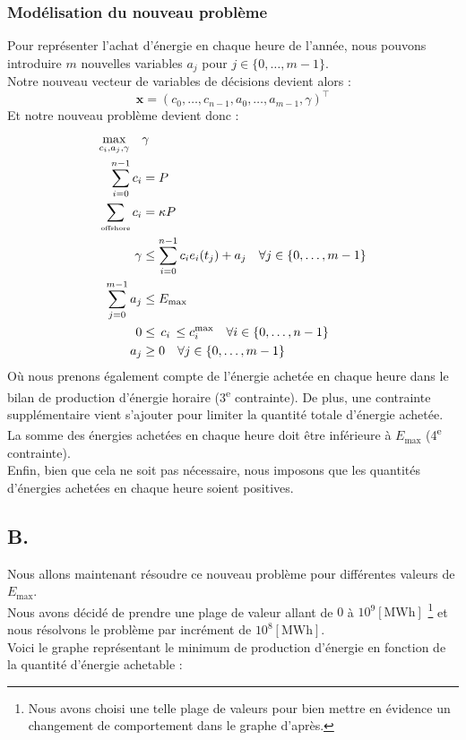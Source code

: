 \documentclass{article}
\begin{document}
\subsubsection*{Modélisation du nouveau problème}
Pour représenter l'achat d'énergie en chaque heure de l'année, nous pouvons introduire $m$ nouvelles variables $a_j$ pour $j \in \{ 0, \ldots, m-1 \}$.\\
Notre nouveau vecteur de variables de décisions devient alors : 
\[ \bm{x} = (c_0, \ldots, c_{n-1}, a_0, \ldots, a_{m-1}, \gamma )^\intercal \]
Et notre nouveau problème devient donc :
\begin{align*}
    \max_{c_i, a_j, \gamma} \quad  &\gamma \\ 
    \sum_{i=0}^{n-1} c_i &= P\\
    \sum_{\text{\tiny offshore}}c_i &= \kappa P\\
    \gamma &\le \sum_{i=0}^{n-1} c_i e_i(t_j) + a_j \quad \forall j \in \{0, \ldots, m-1\}\\
    \sum _{j=0}^{m-1} a_j &\le E_{\text{max}}\\
    0 &\le \, c_i \, \le c_i^{\max} \quad \forall i \in \{0, \ldots, n-1\}\\
    a_j &\ge 0 \quad \forall j \in \{0, \ldots, m-1\}
\end{align*}
Où nous prenons également compte de l'énergie achetée en chaque heure dans le bilan de production d'énergie horaire (3\textsuperscript{e} contrainte).
De plus, une contrainte supplémentaire vient s'ajouter pour limiter la quantité totale d'énergie achetée. La somme des énergies achetées en chaque heure doit être inférieure à $E_{\text{max}}$ (4\textsuperscript{e} contrainte).\\
Enfin, bien que cela ne soit pas nécessaire, nous imposons que les quantités d'énergies achetées en chaque heure soient positives.

\pagebreak

\subsection*{B.}
Nous allons maintenant résoudre ce nouveau problème pour différentes valeurs de $E_{\text{max}}$.\\
Nous avons décidé de prendre une plage de valeur allant de $0$ à $10^{9} [\mathrm{MWh}]$
\footnote{Nous avons choisi une telle plage de valeurs pour bien mettre en évidence un changement de comportement dans le graphe d'après.}
et nous résolvons le problème par incrément de $10^8 [\mathrm{MWh}]$.\\
Voici le graphe représentant le minimum de production d'énergie en fonction de la quantité d'énergie achetable :
\end{document}

